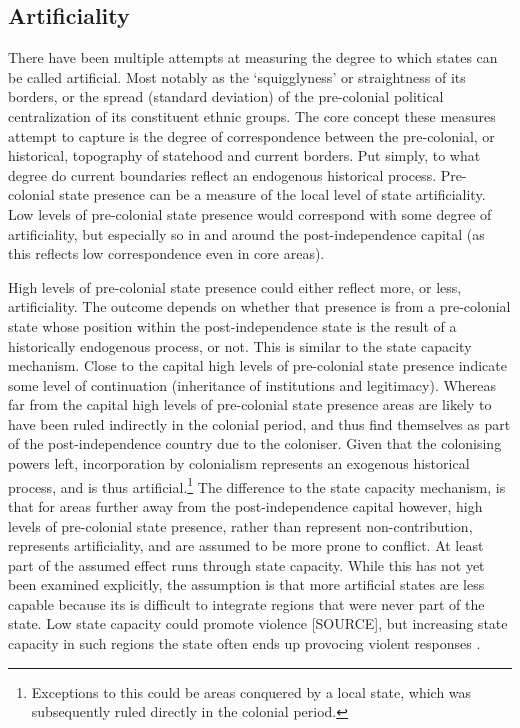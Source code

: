 \documentclass[12pt]{article}
\begin{document}
\subsection{Artificiality} \label{Artificiality}

There have been multiple attempts at measuring the degree to which states can be
called artificial. Most notably as the `squigglyness' or straightness of its
borders, or the spread (standard deviation) of the pre-colonial political
centralization of its constituent ethnic groups. The core concept these measures
attempt to capture is the degree of correspondence between the pre-colonial, or
historical, topography of statehood and current borders. Put simply, to what
degree do current boundaries reflect an endogenous historical process.
Pre-colonial state presence can be a measure of the local level of state
artificiality. Low levels of pre-colonial state presence would correspond with
some degree of artificiality, but especially so in and around the
post-independence capital (as this reflects low correspondence even in core
areas). 

High levels of pre-colonial state presence could either reflect more, or
less, artificiality. The outcome depends on whether that presence is from a
pre-colonial state whose position within the post-independence state is the
result of a historically endogenous process, or not. This is similar to the
state capacity mechanism. Close to the capital high levels of pre-colonial state
presence indicate some level of continuation (inheritance of institutions and
legitimacy). Whereas far from the capital high levels of pre-colonial state
presence areas are likely to have been ruled indirectly in the colonial period,
and thus find themselves as part of the post-independence country due to the
coloniser. Given that the colonising powers left, incorporation by colonialism
represents an exogenous historical process, and is thus
artificial.\footnote{Exceptions to this could be areas conquered by a local
state, which was subsequently ruled directly in the colonial period.} The
difference to the state capacity mechanism, is that for areas further away from
the post-independence capital however, high levels of pre-colonial state
presence, rather than represent non-contribution, represents artificiality, and
are assumed to be more prone to conflict. At least part of the assumed effect
runs through state capacity. While this has not yet been examined explicitly,
the assumption is that more artificial states are less capable because its is
difficult to integrate regions that were never part of the state. 
Low state capacity could promote violence [SOURCE], but increasing state
capacity in such regions the state often ends up provocing violent responses
\citep{Ying_2020}.
\end{document}
